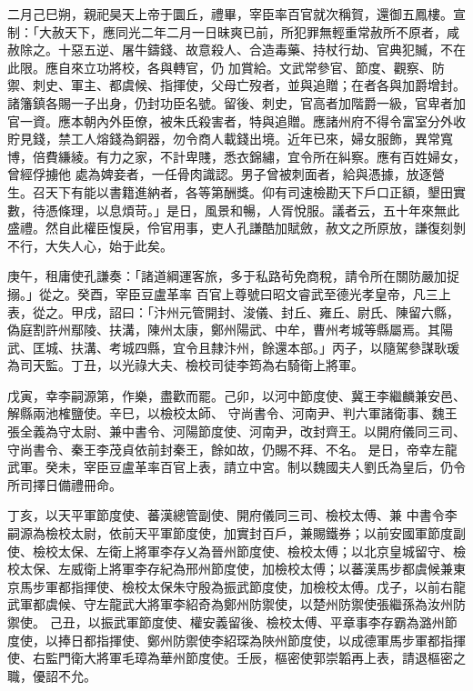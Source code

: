 \begin{pinyinscope}
 二月己巳朔，親祀昊天上帝于圜丘，禮畢，宰臣率百官就次稱賀，還御五鳳樓。宣制：「大赦天下，應同光二年二月一日昧爽已前，所犯罪無輕重常赦所不原者，咸赦除之。十惡五逆、屠牛鑄錢、故意殺人、合造毒藥、持杖行劫、官典犯贓，不在此限。應自來立功將校，各與轉官，仍
 加賞給。文武常參官、節度、觀察、防禦、刺史、軍主、都虞候、指揮使，父母亡歿者，並與追贈；在者各與加爵增封。諸籓鎮各賜一子出身，仍封功臣名號。留後、刺史，官高者加階爵一級，官卑者加官一資。應本朝內外臣僚，被朱氏殺害者，特與追贈。應諸州府不得令富室分外收貯見錢，禁工人熔錢為銅器，勿令商人載錢出境。近年已來，婦女服飾，異常寬博，倍費縑綾。有力之家，不計卑賤，悉衣錦繡，宜令所在糾察。應有百姓婦女，曾經俘擄他
 處為婢妾者，一任骨肉識認。男子曾被刺面者，給與憑據，放逐營生。召天下有能以書籍進納者，各等第酬獎。仰有司速檢勘天下戶口正額，墾田實數，待憑條理，以息煩苛。」是日，風景和暢，人胥悅服。議者云，五十年來無此盛禮。然自此權臣愎戾，伶官用事，吏人孔謙酷加賦斂，赦文之所原放，謙復刻剝不行，大失人心，始于此矣。



 庚午，租庸使孔謙奏：「諸道綱運客旅，多于私路茍免商稅，請令所在關防嚴加捉搦。」從之。癸酉，宰臣豆盧革率
 百官上尊號曰昭文睿武至德光孝皇帝，凡三上表，從之。甲戌，詔曰：「汴州元管開封、浚儀、封丘、雍丘、尉氏、陳留六縣，偽庭割許州鄢陵、扶溝，陳州太康，鄭州陽武、中牟，曹州考城等縣屬焉。其陽武、匡城、扶溝、考城四縣，宜令且隸汴州，餘還本部。」丙子，以隨駕參謀耿瑗為司天監。丁丑，以光祿大夫、檢校司徒李筠為右騎衛上將軍。


戊寅，幸李嗣源第，作樂，盡歡而罷。己卯，以河中節度使、冀王李繼麟兼安邑、解縣兩池榷鹽使。辛巳，以檢校太師、
 守尚書令、河南尹、判六軍諸衛事、魏王張全義為守太尉、兼中書令、河陽節度使、河南尹，改封齊王。以開府儀同三司、守尚書令、秦王李茂貞依前封秦王，餘如故，仍賜不拜、不名。
 是日，帝幸左龍武軍。癸未，宰臣豆盧革率百官上表，請立中宮。制以魏國夫人劉氏為皇后，仍令所司擇日備禮冊命。



 丁亥，以天平軍節度使、蕃漢總管副使、開府儀同三司、檢校太傅、兼
 中書令李嗣源為檢校太尉，依前天平軍節度使，加實封百戶，兼賜鐵券；以前安國軍節度副使、檢校太保、左衛上將軍李存乂為晉州節度使、檢校太傅；以北京皇城留守、檢校太保、左威衛上將軍李存紀為邢州節度使，加檢校太傅；以蕃漢馬步都虞候兼東京馬步軍都指揮使、檢校太保朱守殷為振武節度使，加檢校太傅。戊子，以前右龍武軍都虞候、守左龍武大將軍李紹奇為鄭州防禦使，以楚州防禦使張繼孫為汝州防禦使。
 己丑，以振武軍節度使、權安義留後、檢校太傅、平章事李存霸為潞州節度使，以捧日都指揮使、鄭州防禦使李紹琛為陜州節度使，以成德軍馬步軍都指揮使、右監門衛大將軍毛璋為華州節度使。壬辰，樞密使郭崇韜再上表，請退樞密之職，優詔不允。




\end{pinyinscope}
